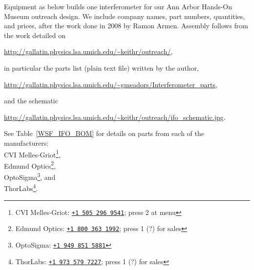 Equipment as below builds one interferometer for our Ann Arbor Hands-On
Museum outreach design. 
We include company names, part numbers, quantities, and
prices, after the work done in 2008 by Ramon Armen. 
Assembly follows from the
work detailed on

\url{http://gallatin.physics.lsa.umich.edu/~keithr/outreach/}, 

in particular the parts list (plain text file) written by the author,

\url{http://gallatin.physics.lsa.umich.edu/~gmeadors/Interferometer_parts},

and the schematic 

\url{http://gallatin.physics.lsa.umich.edu/~keithr/outreach/ifo_schematic.jpg}. 

See Table~\ref{WSF_IFO_BOM} for details on parts from each of the manufacturers: \\
CVI Melles-Griot\footnote{CVI Melles-Griot: \href{tel:15052969541}{\texttt{+1 505 296 9541}}; press 2 at menu},\\
Edmund Optics\footnote{Edmund Optics: \href{tel:18003631992}{\texttt{+1 800 363 1992}}; press 1 (?) for sales},\\
OptoSigma\footnote{OptoSigma: \href{tel:19498515881}{\texttt{+1 949 851 5881}} }, and\\
ThorLabs\footnote{ThorLabs: \href{tel:19735797227}{\texttt{+1 973 579 7227}}; press 1 (?) for sales}.

